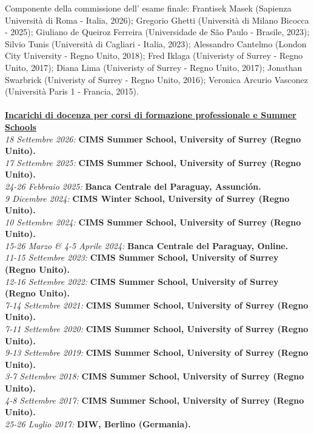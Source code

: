 \documentclass[10p]{article}
\begin{document}
Componente della commissione dell' esame finale: Frantisek Masek (Sapienza Universit\`{a} di Roma - Italia, 2026); Gregorio Ghetti (Università di Milano Bicocca - 2025); Giuliano de Queiroz Ferreira (Universidade de S\~ao Paulo - Brasile, 2023); Silvio Tunis (Universit\`{a} di Cagliari - Italia, 2023); Alessandro Cantelmo (London City University - Regno Unito, 2018); Fred Iklaga (Univeristy of Surrey - Regno Unito, 2017); Diana Lima (Univeristy of Surrey - Regno Unito, 2017); Jonathan Swarbrick (Univeristy of Surrey - Regno Unito, 2016); Veronica Arcurio Vasconez (Universit\`a Paris 1 - Francia, 2015).
\\
\\
{\bf \underline{Incarichi di docenza per corsi di formazione professionale e Summer Schools}} \\
\emph{18 Settembre 2026:} {\bf CIMS Summer School, University of Surrey (Regno Unito).}\\
\emph{17 Settembre 2025:} {\bf CIMS Summer School, University of Surrey (Regno Unito).}\\
\emph{24-26 Febbraio 2025:} {\bf Banca Centrale del Paraguay, Assunción.}\\
\emph{9 Dicembre 2024:} {\bf CIMS Winter School, University of Surrey (Regno Unito).}\\
\emph{10 Settembre 2024:} {\bf CIMS Summer School, University of Surrey (Regno Unito).}\\
\emph{15-26 Marzo \& 4-5 Aprile 2024:} {\bf Banca Centrale del Paraguay, Online.}\\
\emph{11-15 Settembre 2023:} {\bf CIMS Summer School, University of Surrey (Regno Unito).}\\
\emph{12-16 Settembre 2022:} {\bf CIMS Summer School, University of Surrey (Regno Unito).}\\
\emph{7-14 Settembre 2021:} {\bf CIMS Summer School, University of Surrey (Regno Unito).}\\
\emph{7-11 Settembre 2020:} {\bf CIMS Summer School, University of Surrey (Regno Unito).}\\
\emph{9-13 Settembre 2019:} {\bf CIMS Summer School, University of Surrey (Regno Unito).}\\
\emph{3-7 Settembre 2018:} {\bf CIMS Summer School, University of Surrey (Regno Unito).}\\
\emph{4-8 Settembre 2017:} {\bf CIMS Summer School, University of Surrey (Regno Unito).}\\
\emph{25-26 Luglio 2017:} {\bf DIW, Berlino (Germania).}\\
\end{document}
